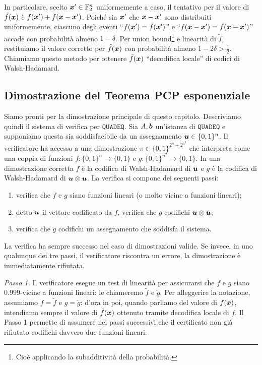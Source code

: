 In particolare, scelto $\bm{x}' \in \mathbb{F}_2^n$ uniformemente a caso, il tentativo per
il valore di $\tilde{f}(\bm{x})$ è $f(\bm{x}') + f(\bm{x} - \bm{x}')$. Poiché sia $\bm{x}'$ che
$\bm{x} - \bm{x}'$ sono distribuiti uniformemente, ciascuno degli eventi
``$f(\bm{x}') = \tilde{f}(\bm{x}')$'' e ``$f(\bm{x} - \bm{x}') = \tilde{f}(\bm{x} - \bm{x}')$''
accade con probabilità almeno $1 - \delta$. Per union
bound\footnote{Cioè applicando la subadditività della probabilità.} e
linearità di $\tilde{f}$, restituiamo il valore corretto per $\tilde{f}(\bm{x})$
con probabilità almeno $1 - 2 \delta > \frac12$.
Chiamiamo questo metodo per ottenere $\tilde{f}(\bm{x})$ ``decodifica locale''
di codici di Walsh-Hadamard.

\subsection{Dimostrazione del Teorema PCP esponenziale}

Siamo pronti per la dimostrazione principale di questo capitolo.
Descriviamo quindi il sistema di verifica per $\mathtt{QUADEQ}$.
Sia $A, \bm{b}$ un'istanza di $\mathtt{QUADEQ}$ e supponiamo questa sia
soddisfacibile da un assegnamento $\bm{u} \in \{0, 1\}^n$. Il verificatore
ha accesso a una dimostrazione $\pi \in \{0, 1\}^{2^n + 2^{n^2}}$ che
interpreta come una coppia di funzioni $f\colon \{0, 1\}^n \to \{0, 1\}$
e $g\colon \{0, 1\}^{n^2} \to \{0, 1\}$. In una dimostrazione corretta $f$
è la codifica di Walsh-Hadamard di $\bm{u}$ e $g$ è la codifica di
Walsh-Hadamard di $\bm{u} \otimes \bm{u}$.
La verifica si compone dei seguenti passi:
\begin{enumerate}
	\item verifica che $f$ e $g$ siano funzioni lineari (o molto vicine a funzioni
		lineari);
	\item detto $\bm{u}$ il vettore codificato da $f$, verifica che $g$ codifichi
		$\bm{u} \otimes \bm{u}$;
	\item verifica che $g$ codifichi un assegnamento che soddisfa il sistema.
\end{enumerate}

La verifica ha sempre successo nel caso di dimostrazioni valide.
Se invece, in uno qualunque dei tre passi, il verificatore riscontra un errore,
la dimostrazione è immediatamente rifiutata.

\emph{Passo 1.}
Il verificatore esegue un test di linearità per assicurarsi che $f$ e $g$ siano
$0.999$-vicine a funzioni lineari: le chiameremo $\tilde{f}$ e $\tilde{g}$.
Per alleggerire la notazione, assumiamo $f = \tilde{f}$ e $g = \tilde{g}$:
d'ora in poi, quando parliamo del valore di $f(\bm{x})$, intendiamo sempre il
valore di $\tilde{f}(\bm{x})$ ottenuto tramite decodifica locale di $f$.
Il Passo 1 permette di assumere nei passi successivi che il certificato non
già rifiutato codifichi davvero due funzioni lineari.

